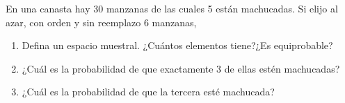 \item En una canasta hay 30 manzanas de las cuales 5 están machucadas. Si elijo al azar, con orden y sin reemplazo 6 manzanas,
    \begin{enumerate}
        \item Defina un espacio muestral. ¿Cuántos elementos tiene?¿Es equiprobable?
        \item ¿Cuál es la probabilidad de que exactamente 3 de ellas estén machucadas?
        \item ¿Cuál es la probabilidad de que la tercera esté machucada?
    \end{enumerate}